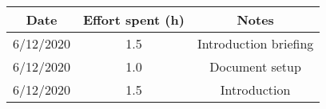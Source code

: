 \documentclass[../../main.tex]{subfiles}
\begin{document}
\begin{center}
    \begin{tabular}{|c| |c| |c|} 
        \hline
        Date & Effort spent (h) & Notes\\ [0.5ex] 
        \hline\hline
        6/12/2020 & 1.5 & Introduction briefing\\ 
        6/12/2020 & 1.0 & Document setup\\
        6/12/2020 & 1.5 & Introduction\\
        \hline
    \end{tabular}
\end{center}
\end{document}
